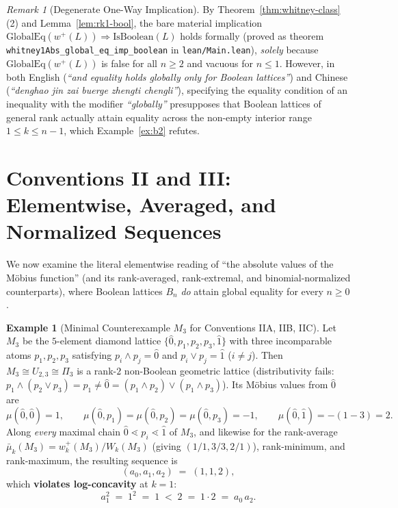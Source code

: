 \documentclass[11pt]{article}
\theoremstyle{definition}
\newtheorem{example}[theorem]{Example}
\theoremstyle{remark}
\newtheorem{remark}[theorem]{Remark}
\newcommand{\hatzero}{\hat{0}}
\newcommand{\hatone}{\hat{1}}
\begin{document}
\begin{remark}[Degenerate One-Way Implication]
By Theorem~\ref{thm:whitney-class}(2) and Lemma~\ref{lem:rk1-bool}, the bare material implication $\mathrm{GlobalEq}(w^+(L)) \Rightarrow \mathrm{IsBoolean}(L)$ holds formally (proved as theorem \texttt{whitney1Abs\_\allowbreak global\_\allowbreak eq\_\allowbreak imp\_\allowbreak boolean} in \texttt{lean/Main.lean}), \emph{solely} because $\mathrm{GlobalEq}(w^+(L))$ is false for all $n \ge 2$ and vacuous for $n \le 1$. However, in both English (\emph{``and equality holds globally only for Boolean lattices''}) and Chinese (\emph{``denghao jin zai buerge zhengti chengli''}), specifying the equality condition of an inequality with the modifier \emph{``globally''} presupposes that Boolean lattices of general rank actually attain equality across the non-empty interior range $1 \le k \le n-1$, which Example~\ref{ex:b2} refutes.
\end{remark}

\section{Conventions II and III: Elementwise, Averaged, and Normalized Sequences}

We now examine the literal elementwise reading of ``the absolute values of the M\"obius function'' (and its rank-averaged, rank-extremal, and binomial-normalized counterparts), where Boolean lattices $B_n$ \emph{do} attain global equality for every $n \ge 0$.

\begin{example}[Minimal Counterexample $M_3$ for Conventions IIA, IIB, IIC]
\label{ex:m3}
Let $M_3$ be the $5$-element diamond lattice $\{\hatzero, p_1, p_2, p_3, \hatone\}$ with three incomparable atoms $p_1, p_2, p_3$ satisfying $p_i \wedge p_j = \hatzero$ and $p_i \vee p_j = \hatone$ ($i \neq j$). Then $M_3 \cong U_{2,3} \cong \Pi_3$ is a rank-$2$ non-Boolean geometric lattice (distributivity fails: $p_1 \wedge (p_2 \vee p_3) = p_1 \neq \hatzero = (p_1 \wedge p_2) \vee (p_1 \wedge p_3)$). Its M\"obius values from $\hatzero$ are
\[
  \mu(\hatzero, \hatzero) = 1, \qquad \mu(\hatzero, p_1) = \mu(\hatzero, p_2) = \mu(\hatzero, p_3) = -1, \qquad \mu(\hatzero, \hatone) = -(1 - 3) = 2.
\]
Along \emph{every} maximal chain $\hatzero \lessdot p_i \lessdot \hatone$ of $M_3$, and likewise for the rank-average $\bar{\mu}_k(M_3) = w_k^+(M_3)/W_k(M_3)$ (giving $(1/1, 3/3, 2/1)$), rank-minimum, and rank-maximum, the resulting sequence is
\[
  (a_0, a_1, a_2) \;=\; (1, 1, 2),
\]
which \textbf{violates log-concavity} at $k = 1$:
\[
  a_1^2 \;=\; 1^2 \;=\; 1 \;<\; 2 \;=\; 1 \cdot 2 \;=\; a_0\,a_2.
\]
\end{example}
\end{document}
